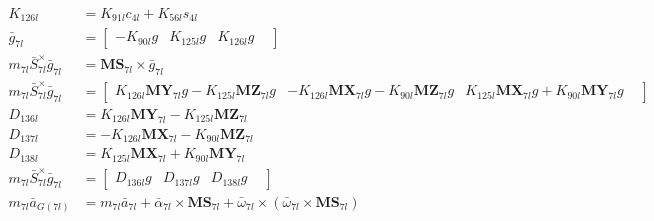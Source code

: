 \begin{align}
K_{126l} &= K_{91l}c_{4l} + K_{56l}s_{4l} \nonumber \\
 \bar{g}_{7l} &= \left[\begin{matrix} -K_{90l}g & K_{125l}g & K_{126l}g &  \end{matrix}\right] 
 \nonumber \\ 
 m_{7l}\bar{S}_{7l}^{\times}\bar{g}_{7l} &= \mathbf{MS}_{7l} \times \bar{g}_{7l} 
 \nonumber \\ 
 m_{7l}\bar{S}_{7l}^{\times}\bar{g}_{7l} &= \left[\begin{matrix} K_{126l}\mathbf{MY}_{7l}g - K_{125l}\mathbf{MZ}_{7l}g & - K_{126l}\mathbf{MX}_{7l}g - K_{90l}\mathbf{MZ}_{7l}g & K_{125l}\mathbf{MX}_{7l}g + K_{90l}\mathbf{MY}_{7l}g &  \end{matrix}\right] 
 \nonumber \\ 
D_{136l} &= K_{126l}\mathbf{MY}_{7l} - K_{125l}\mathbf{MZ}_{7l} \nonumber \\
D_{137l} &= - K_{126l}\mathbf{MX}_{7l} - K_{90l}\mathbf{MZ}_{7l} \nonumber \\
D_{138l} &= K_{125l}\mathbf{MX}_{7l} + K_{90l}\mathbf{MY}_{7l} \nonumber \\
 m_{7l}\bar{S}_{7l}^{\times}\bar{g}_{7l} &= \left[\begin{matrix} D_{136l}g & D_{137l}g & D_{138l}g &  \end{matrix}\right] 
 \nonumber \\ 
 m_{7l}\bar{a}_{G(7l)} &= m_{7l}\bar{a}_{7l} + \bar\alpha_{7l} \times \mathbf{MS}_{7l} + \bar\omega_{7l} \times \left(\bar\omega_{7l} \times \mathbf{MS}_{7l}\right) 
 \nonumber \\ 

\end{align}
